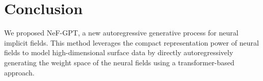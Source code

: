 \section{Conclusion}

We proposed NeF-GPT, a new autoregressive generative process for neural implicit fields. This method leverages the compact representation power of neural fields to model high-dimensional surface data by directly autoregressively generating the weight space of the neural fields using a transformer-based approach.